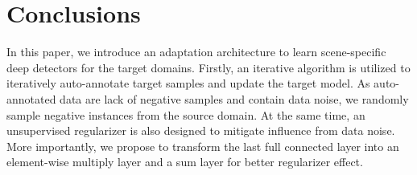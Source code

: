 \documentclass[runningheads]{llncs}
\begin{document}
\section{Conclusions}
\label{section:Conclusions}

In this paper, we introduce an adaptation architecture to learn scene-specific deep detectors for the target domains. Firstly, an iterative algorithm is utilized to iteratively auto-annotate target samples and update the target model. As auto-annotated data are lack of negative samples and contain data noise, we randomly sample negative instances from the source domain. At the same time, an unsupervised regularizer is also designed to mitigate influence from data noise. More importantly, we propose to transform the last full connected layer into an element-wise multiply layer and a sum layer for better regularizer effect.




\end{document}
